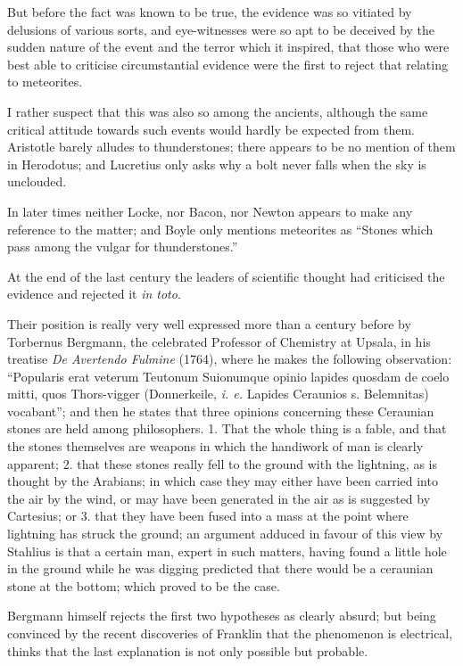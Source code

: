 \documentclass[a4paper, 11pt, oneside]{article}
\begin{document}
But before the fact was known to be true, the evidence was so vitiated by delusions of various sorts, and eye-witnesses were so apt to be deceived by the sudden nature of the event and the terror which it inspired, that those who were best able to criticise circumstantial evidence were the first to reject that relating to meteorites. 

I rather suspect that this was also so among the ancients, although the same critical attitude towards such events would hardly be expected from them. Aristotle barely alludes to thunderstones; there appears to be no mention of them in Herodotus; and Lucretius only asks why a bolt never falls when the sky is unclouded. 

In later times neither Locke, nor Bacon, nor Newton appears to make any reference to the matter; and Boyle only mentions meteorites as ``Stones which pass among the vulgar for thunderstones.'' 

At the end of the last century the leaders of scientific thought had criticised the evidence and rejected it \emph{in toto}. 

Their position is really very well expressed more than a century before by Torbernus Bergmann, the celebrated Professor of Chemistry at Upsala, in his treatise \emph{De Avertendo Fulmine} (1764), where he makes the following observation: ``Popularis erat veterum Teutonum Suionumque opinio lapides quosdam de coelo mitti, quos Thors-vigger (Donnerkeile, \emph{i. e.} Lapides Ceraunios s. Belemnitas) vocabant''; and then he states that three opinions concerning these Ceraunian stones are held among philosophers. 1. That the whole thing is a fable, and that the stones themselves are weapons in which the handiwork of man is clearly apparent; 2. that these stones really fell to the ground with the lightning, as is thought by the Arabians; in which case they may either have been carried into the air by the wind, or may have been generated in the air as is suggested by Cartesius; or 3. that they have been fused into a mass at the point where lightning has struck the ground; an argument adduced in favour of this view by Stahlius is that a certain man, expert in such matters, having found a little hole in the ground while he was digging predicted that there would be a ceraunian stone at the bottom; which proved to be the case. 

Bergmann himself rejects the first two hypotheses as clearly absurd; but being convinced by the recent discoveries of Franklin that the phenomenon is electrical, thinks that the last explanation is not only possible but probable. 
\end{document}
